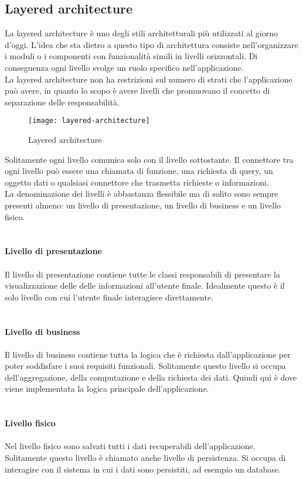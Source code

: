 \subsection{Layered architecture}
La layered architecture è uno degli stili architetturali più utilizzati al giorno d'oggi. L'idea che sta dietro a
questo tipo di architettura consiste nell'organizzare i moduli o i componenti con funzionalità simili
in livelli orizzontali. Di conseguenza ogni livello svolge un ruolo specifico nell'applicazione.
\\
La layered architecture non ha restrizioni sul numero di strati che l'applicazione può avere, in quanto 
lo scopo è avere livelli che promuovano il concetto di separazione delle responsabilità.
\clearpage
\begin{figure}[H]
    \centering
    \texttt{[image: layered-architecture]}
    \caption{Layered architecture}
\end{figure}
\leavevmode\newline
Solitamente ogni livello comunica solo con il livello sottostante. Il connettore tra ogni livello può 
essere una chiamata di funzione, una richiesta di query, un oggetto dati o qualsiasi connettore che
trasmetta richieste o informazioni.
\\
La denominazione dei livelli è abbastanza flessibile ma di solito sono sempre presenti almeno: un livello di presentazione, un livello
di business e un livello fisico.
\\\\\\
\textbf{Livello di presentazione}
\\\\
Il livello di presentazione contiene tutte le classi responsabili di presentare la visualizzazione delle
delle informazioni all'utente finale. Idealmente questo è il solo livello con cui l'utente finale 
interagisce direttamente.
\\\\\\
\textbf{Livello di business}
\\\\
Il livello di business contiene tutta la logica che è richiesta dall'applicazione per poter soddisfare i 
suoi requisiti funzionali. Solitamente questo livello si occupa dell'aggregazione, della computazione
e della richiesta dei dati. Quindi qui è dove viene implementata la logica principale dell'applicazione.
\\\\\\
\textbf{Livello fisico}
\\\\
Nel livello fisico sono salvati tutti i dati recuperabili dell'applicazione. Solitamente questo livello è chiamato
anche livello di persistenza. Si occupa di interagire con il sistema in cui i dati 
sono persistiti, ad esempio un database.
